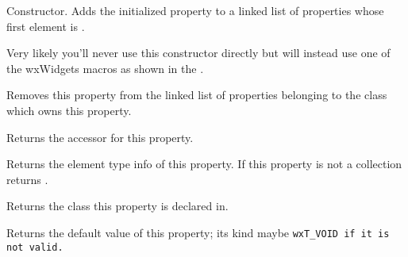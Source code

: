 
Constructor. Adds the initialized property to a linked list of  properties 
whose first element is .

Very likely you'll never use this constructor directly but will instead use one of the wxWidgets
macros as shown in the .


\label{wxpropertyinfodtor}


Removes this property from the linked list of properties belonging to the class which owns this property.


\label{wxpropertyinfogetaccessor}


Returns the accessor for this property.


\label{wxpropertyinfogetcollectionelementtypeinfo}


Returns the element type info of this property. If this property is not a collection returns \NULL.


\label{wxpropertyinfogetdeclaringclass}


Returns the class this property is declared in.


\label{wxpropertyinfogetdefaultvalue}


Returns the default value of this property; its kind maybe \tt{wxT\_VOID} if it is not valid.


\label{wxpropertyinfogetflags}

